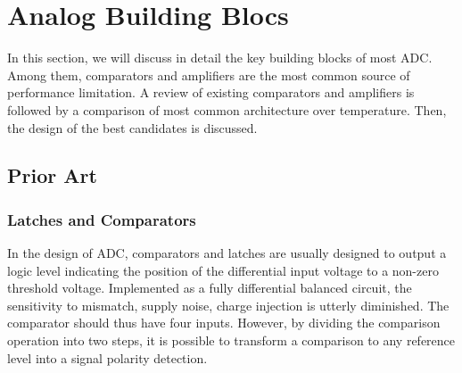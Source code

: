 \chapter{Analog Building Blocs}
\label{sec:analog-building-bloc}

\ifpdf
    \graphicspath{{Chapter7/Figs/Raster/}{Chapter7/Figs/PDF/}{Chapter4/Figs/}}
\else
    \graphicspath{{Chapter7/Figs/Vector/}{Chapter7/Figs/}}
\fi 

In this section, we will discuss in detail the key building blocks of most ADC\@. Among them, comparators and amplifiers are the most common source of performance limitation. A review of existing comparators and amplifiers is followed by a comparison of most common architecture over temperature. Then, the design of the best candidates is discussed.

\section{Prior Art}                              %
    \subsection{Latches and Comparators}         %
    \label{sec:latches}
In the design of ADC, comparators and latches are usually designed to output a logic level indicating the position of the differential input voltage to a non-zero threshold voltage. Implemented as a fully differential balanced circuit, the sensitivity to mismatch, supply noise, charge injection is utterly diminished. The comparator should thus have four inputs. However, by dividing the comparison operation into two steps, it is possible to transform a comparison to any reference level into a signal polarity detection.

